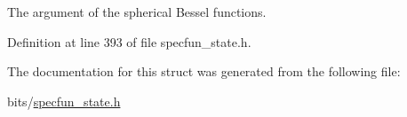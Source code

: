 The argument of the spherical Bessel functions. 



Definition at line 393 of file specfun\+\_\+state.\+h.



The documentation for this struct was generated from the following file\+:\begin{DoxyCompactItemize}
\item 
bits/\hyperlink{specfun__state_8h}{specfun\+\_\+state.\+h}\end{DoxyCompactItemize}
